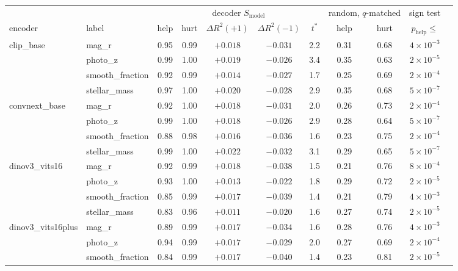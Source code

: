 \begin{tabular}{llccccccccc}
\toprule
 & & \multicolumn{5}{c}{decoder $S_{\mathrm{model}}$} & \multicolumn{2}{c}{random, $q$-matched} & sign test \\
encoder & label & help & hurt & $\Delta R^2(+1)$ & $\Delta R^2(-1)$ & $t^{*}$ & help & hurt & $p_{\mathrm{help}}\le$ \\
\midrule
clip\_base & mag\_r & 0.95 & 0.99 & $+0.018$ & $-0.031$ & 2.2 & 0.31 & 0.68 & $4\times 10^{-3}$ \\
 & photo\_z & 0.99 & 1.00 & $+0.019$ & $-0.026$ & 3.4 & 0.35 & 0.63 & $2\times 10^{-5}$ \\
 & smooth\_fraction & 0.92 & 0.99 & $+0.014$ & $-0.027$ & 1.7 & 0.25 & 0.69 & $2\times 10^{-4}$ \\
 & stellar\_mass & 0.97 & 1.00 & $+0.020$ & $-0.028$ & 2.9 & 0.35 & 0.68 & $5\times 10^{-7}$ \\
\addlinespace[2pt]
convnext\_base & mag\_r & 0.92 & 1.00 & $+0.018$ & $-0.031$ & 2.0 & 0.26 & 0.73 & $2\times 10^{-4}$ \\
 & photo\_z & 0.99 & 1.00 & $+0.018$ & $-0.026$ & 2.9 & 0.28 & 0.64 & $5\times 10^{-7}$ \\
 & smooth\_fraction & 0.88 & 0.98 & $+0.016$ & $-0.036$ & 1.6 & 0.23 & 0.75 & $2\times 10^{-4}$ \\
 & stellar\_mass & 0.99 & 1.00 & $+0.022$ & $-0.032$ & 3.1 & 0.29 & 0.65 & $5\times 10^{-7}$ \\
\addlinespace[2pt]
dinov3\_vits16 & mag\_r & 0.92 & 0.99 & $+0.018$ & $-0.038$ & 1.5 & 0.21 & 0.76 & $8\times 10^{-4}$ \\
 & photo\_z & 0.93 & 1.00 & $+0.013$ & $-0.022$ & 1.8 & 0.29 & 0.72 & $2\times 10^{-5}$ \\
 & smooth\_fraction & 0.85 & 0.99 & $+0.017$ & $-0.039$ & 1.4 & 0.21 & 0.79 & $4\times 10^{-3}$ \\
 & stellar\_mass & 0.83 & 0.96 & $+0.011$ & $-0.020$ & 1.6 & 0.27 & 0.74 & $2\times 10^{-5}$ \\
\addlinespace[2pt]
dinov3\_vits16plus & mag\_r & 0.89 & 0.99 & $+0.017$ & $-0.034$ & 1.6 & 0.28 & 0.76 & $4\times 10^{-3}$ \\
 & photo\_z & 0.94 & 0.99 & $+0.017$ & $-0.029$ & 2.0 & 0.27 & 0.69 & $2\times 10^{-4}$ \\
 & smooth\_fraction & 0.84 & 0.99 & $+0.017$ & $-0.040$ & 1.4 & 0.23 & 0.81 & $2\times 10^{-5}$ \\

\end{tabular}
